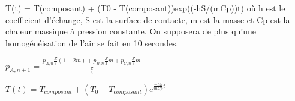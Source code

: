 T(t) = T(composant) + (T0 - T(composant))exp((-hS/(mCp))t) 
où h est le coefficient d'échange, S est la surface de contacte, m est la masse et Cp est la chaleur massique à pression constante.
On supposera de plus qu'une homogénéisation de l'air se fait en 10 secondes.


$p_{A,n+1} = \frac{p_{A,n}\frac{Z}{3}(1 - 2m) + p_{B,n}\frac{Z}{3}m + p_{C,n}\frac{Z}{3}m}{\frac{Z}{3}}$ 

$T(t) = T_{composant} + (T_{0} - T_{composant})e^{\frac{-hS}{mCp}t}$
